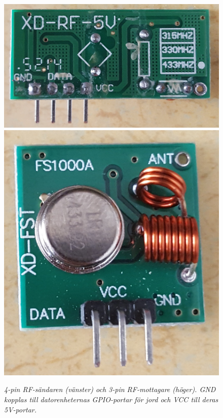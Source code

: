 \documentclass[a4paper]{article}
\begin{document}
\begin{figure}[H]
\includegraphics[scale=0.06]{RF-transmitter.jpg}
\includegraphics[scale=0.05]{RF-receiver.jpg}
\centering
\caption{\it 4-pin RF-sändaren (vänster) och 3-pin RF-mottagare (höger). GND kopplas till datorenheternas GPIO-portar för jord och VCC till deras 5V-portar.}
\end{figure} 
\end{document}

